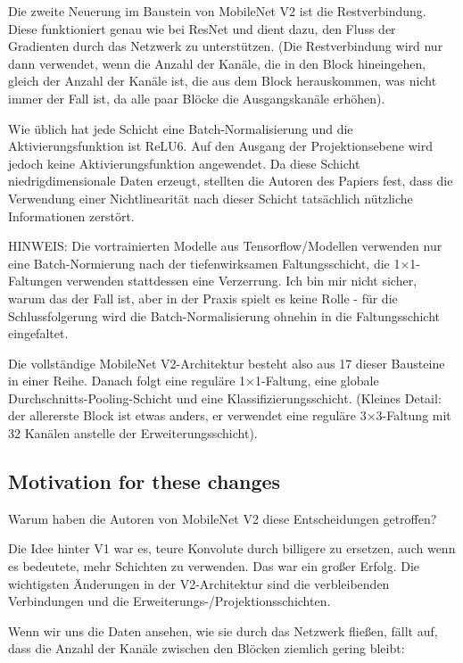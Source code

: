 Die zweite Neuerung im Baustein von MobileNet V2 ist die Restverbindung. Diese funktioniert genau wie bei ResNet und dient dazu, den Fluss der Gradienten durch das Netzwerk zu unterstützen. (Die Restverbindung wird nur dann verwendet, wenn die Anzahl der Kanäle, die in den Block hineingehen, gleich der Anzahl der Kanäle ist, die aus dem Block herauskommen, was nicht immer der Fall ist, da alle paar Blöcke die Ausgangskanäle erhöhen).

Wie üblich hat jede Schicht eine Batch-Normalisierung und die Aktivierungsfunktion ist ReLU6. Auf den Ausgang der Projektionsebene wird jedoch keine Aktivierungsfunktion angewendet. Da diese Schicht niedrigdimensionale Daten erzeugt, stellten die Autoren des Papiers fest, dass die Verwendung einer Nichtlinearität nach dieser Schicht tatsächlich nützliche Informationen zerstört.

HINWEIS: Die vortrainierten Modelle aus Tensorflow/Modellen verwenden nur eine Batch-Normierung nach der tiefenwirksamen Faltungsschicht, die 1×1-Faltungen verwenden stattdessen eine Verzerrung. Ich bin mir nicht sicher, warum das der Fall ist, aber in der Praxis spielt es keine Rolle - für die Schlussfolgerung wird die Batch-Normalisierung ohnehin in die Faltungsschicht eingefaltet.

Die vollständige MobileNet V2-Architektur besteht also aus 17 dieser Bausteine in einer Reihe. Danach folgt eine reguläre 1×1-Faltung, eine globale Durchschnitts-Pooling-Schicht und eine Klassifizierungsschicht. (Kleines Detail: der allererste Block ist etwas anders, er verwendet eine reguläre 3×3-Faltung mit 32 Kanälen anstelle der Erweiterungsschicht).

\subsection{Motivation for these changes}

Warum haben die Autoren von MobileNet V2 diese Entscheidungen getroffen?

Die Idee hinter V1 war es, teure Konvolute durch billigere zu ersetzen, auch wenn es bedeutete, mehr Schichten zu verwenden. Das war ein großer Erfolg. Die wichtigsten Änderungen in der V2-Architektur sind die verbleibenden Verbindungen und die Erweiterungs-/Projektionsschichten.

Wenn wir uns die Daten ansehen, wie sie durch das Netzwerk fließen, fällt auf, dass die Anzahl der Kanäle zwischen den Blöcken ziemlich gering bleibt:



